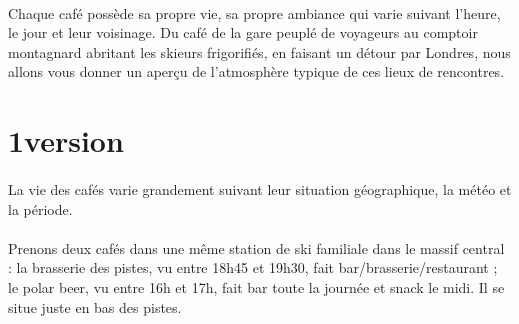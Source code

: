 \paragraph{}
Chaque café possède sa propre vie, sa propre ambiance qui varie suivant
l’heure, le jour et leur voisinage. Du café de la gare peuplé de voyageurs au
comptoir montagnard abritant les skieurs frigorifiés, en faisant un détour par
Londres, nous allons vous donner un aperçu de l’atmosphère typique de ces lieux
de rencontres.

\section{1\ier version}
\paragraph{}
La vie des cafés varie grandement suivant leur situation géographique, la météo
et la période.

\paragraph{}
Prenons deux cafés dans une même station de ski familiale dans le massif
central : la brasserie des pistes, vu entre 18h45 et 19h30, fait
bar/brasserie/restaurant ; le polar beer, vu entre 16h et 17h, fait bar toute
la journée et snack le midi. Il se situe juste en bas des pistes.


